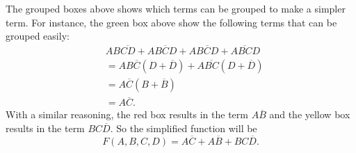 \documentclass[11pt,a4paper]{article}
\begin{document}
	The grouped boxes above shows which terms can be grouped to make a simpler term. For instance, the green box above show the following terms that can be grouped easily:
	\begin{align*}
		&AB\overline{CD} + AB\overline{C}D + A\overline{BCD} + A\overline{BC}D\\
		&= AB\overline C (D+\overline D) + A\overline{BC}(D+\overline D)\\
		&= A\overline C(B+\overline B) \\
		&= A\overline C.
	\end{align*}
	With a similar reasoning, the red box results in the term $ A\overline B $ and the yellow box results in the term $ BC\overline D $. So the simplified function will be
	\[ F(A,B,C,D) = A\overline C + A\overline B + BC\overline D. \]

	
	

	
\end{document}
